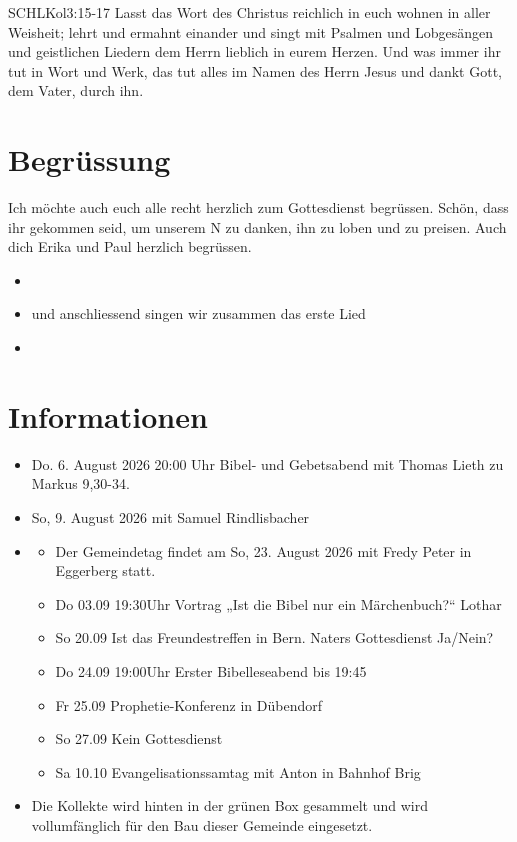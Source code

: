 \documentclass[fontsize=14pt]{mybib}
\author{OTS}
\newcommand{\Name}{Paul}
\begin{document}
\begin{bibelbox}{SCHL}{Kol}{3:15-17}
    Lasst das Wort des Christus reichlich in euch wohnen in aller Weisheit; lehrt und ermahnt einander und singt mit Psalmen und Lobgesängen und geistlichen Liedern dem Herrn lieblich in eurem Herzen. Und was immer ihr tut in Wort und Werk, das tut alles im Namen des Herrn Jesus und dankt Gott, dem Vater, durch ihn.
\end{bibelbox}
\section{Begrüssung}
Ich möchte auch euch alle recht herzlich zum Gottesdienst begrüssen. Schön, dass ihr gekommen seid, um unserem \herr N zu danken, ihn zu loben und zu preisen. 
Auch dich Erika und \Name{} herzlich begrüssen. 

\begin{itemize}
    \item[] 
    \item[] und anschliessend singen wir zusammen das erste Lied
    \item[] 
\end{itemize}
\section{Informationen}
\begin{itemize}
    \item {} Do. 6. August 2026 20:00 Uhr Bibel- und Gebetsabend mit Thomas Lieth zu Markus 9,30-34.\\
    \item {} So, 9. August 2026 mit Samuel Rindlisbacher
    \item {} 
        \begin{itemize}
            \item Der Gemeindetag findet am So, 23. August 2026 mit Fredy Peter in Eggerberg statt.
            \item Do 03.09          19:30Uhr Vortrag „Ist die Bibel nur ein Märchenbuch?“ Lothar
            \item So 20.09          Ist das Freundestreffen in Bern. Naters Gottesdienst Ja/Nein?
            \item Do 24.09          19:00Uhr Erster Bibelleseabend bis 19:45
            \item Fr 25.09          Prophetie-Konferenz in Dübendorf
            \item So 27.09          Kein Gottesdienst
            \item Sa 10.10          Evangelisationssamtag mit Anton in Bahnhof Brig
        \end{itemize}
    \item {} Die Kollekte wird hinten in der grünen Box gesammelt und wird vollumfänglich für den Bau dieser Gemeinde eingesetzt.
\end{itemize}
\end{document}
